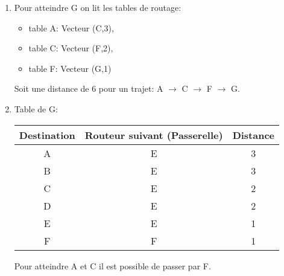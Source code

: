 \documentclass[a4paper,11pt]{article}
\begin{document}
\begin{exo}
\begin{enumerate}
    \item Pour atteindre G on lit les tables de routage:
    \begin{itemize}
        \item table A: Vecteur (C,3),
        \item table C: Vecteur (F,2),
        \item table F: Vecteur (G,1)
    \end{itemize}
    Soit une distance de 6 pour un trajet: A $\rightarrow$ C $\rightarrow$ F $\rightarrow$ G.
    \item Table de G:
    \begin{center}
        \begin{tabular}{|*{3}{c|}}
            \hline
            Destination & Routeur suivant (Passerelle) & Distance \\
            \hline
            A & E & 3\\
            \hline
            B & E & 3\\
            \hline
            C & E & 2\\
            \hline
            D & E & 2\\
            \hline
            E & E & 1\\
            \hline
            F & F & 1\\
            \hline
        \end{tabular}
    \end{center}
    \begin{aretenir}[Remarque]
    Pour atteindre A et C il est possible de passer par F.
    \end{aretenir}
\end{enumerate}
\end{exo}
\end{document}
